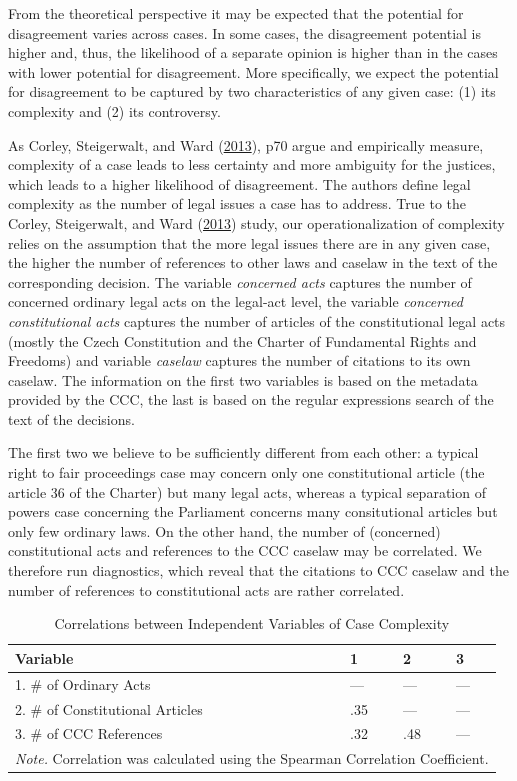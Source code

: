\documentclass[
  11pt,
]{article}
\begin{document}
From the theoretical perspective it may be expected that the potential
for disagreement varies across cases. In some cases, the disagreement
potential is higher and, thus, the likelihood of a separate opinion is
higher than in the cases with lower potential for disagreement. More
specifically, we expect the potential for disagreement to be captured by
two characteristics of any given case: (1) its complexity and (2) its
controversy.

As Corley, Steigerwalt, and Ward
(\protect\hyperlink{ref-corleyPuzzleUnanimityConsensus2013}{2013}), p70
argue and empirically measure, complexity of a case leads to less
certainty and more ambiguity for the justices, which leads to a higher
likelihood of disagreement. The authors define legal complexity as the
number of legal issues a case has to address. True to the Corley,
Steigerwalt, and Ward
(\protect\hyperlink{ref-corleyPuzzleUnanimityConsensus2013}{2013})
study, our operationalization of complexity relies on the assumption
that the more legal issues there are in any given case, the higher the
number of references to other laws and caselaw in the text of the
corresponding decision. The variable \emph{concerned acts} captures the
number of concerned ordinary legal acts on the legal-act level, the
variable \emph{concerned constitutional acts} captures the number of
articles of the constitutional legal acts (mostly the Czech Constitution
and the Charter of Fundamental Rights and Freedoms) and variable
\emph{caselaw} captures the number of citations to its own caselaw. The
information on the first two variables is based on the metadata provided
by the CCC, the last is based on the regular expressions search of the
text of the decisions.

The first two we believe to be sufficiently different from each other: a
typical right to fair proceedings case may concern only one
constitutional article (the article 36 of the Charter) but many legal
acts, whereas a typical separation of powers case concerning the
Parliament concerns many consitutional articles but only few ordinary
laws. On the other hand, the number of (concerned) constitutional acts
and references to the CCC caselaw may be correlated. We therefore run
diagnostics, which reveal that the citations to CCC caselaw and the
number of references to constitutional acts are rather correlated.

\begin{table}

\caption{\label{tab:unnamed-chunk-2}Correlations between Independent Variables of Case Complexity}
\centering
\begin{tabular}[t]{l|l|l|l}
\hline
\textbf{Variable} & \textbf{1} & \textbf{2} & \textbf{3}\\
\hline
1. \# of Ordinary Acts & — & — & —\\
\hline
2. \# of Constitutional Articles & .35 & — & —\\
\hline
3. \# of CCC References & .32 & .48 & —\\
\hline
\multicolumn{4}{l}{\rule{0pt}{1em}\textit{Note.} Correlation was calculated using the Spearman Correlation Coefficient.}\\
\end{tabular}
\end{table}
\end{document}
